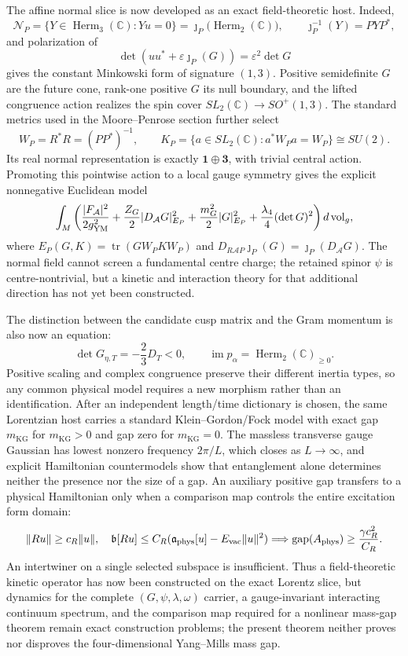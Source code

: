 \documentclass[10pt,letterpaper]{article}
\begin{document}
The affine normal slice is now developed as an exact field-theoretic host.
Indeed,
\[
 \mathcal N_P=\{Y\in\operatorname{Herm}_3(\mathbb C):Yu=0\}
 =\jmath_P\bigl(\operatorname{Herm}_2(\mathbb C)\bigr),
 \qquad \jmath_P^{-1}(Y)=PYP^*,
\]
and polarization of
\[
 \det(uu^*+\varepsilon\jmath_P(G))=\varepsilon^2\det G
\]
gives the constant Minkowski form of signature \((1,3)\).  Positive
semidefinite \(G\) are the future cone, rank-one positive \(G\) its null
boundary, and the lifted congruence action realizes the spin cover
\(SL_2(\mathbb C)\to SO^+(1,3)\).  The standard metrics used in the
Moore--Penrose section further select
\[
 W_P=R^*R=(PP^*)^{-1},\qquad
 K_P=\{a\in SL_2(\mathbb C):a^*W_Pa=W_P\}\cong SU(2).
\]
Its real normal representation is exactly
\(\boldsymbol1\oplus\boldsymbol3\), with trivial central action.  Promoting
this pointwise action to a local gauge symmetry gives the explicit
nonnegative Euclidean model
\[
 \int_M\left(
 \frac{|F_{\mathcal A}|^2}{2g_{\rm YM}^2}
 +\frac{Z_G}{2}|D_{\mathcal A}G|_{E_P}^2
 +\frac{m_G^2}{2}|G|_{E_P}^2
 +\frac{\lambda_4}{4}(\det G)^2\right)d\operatorname{vol}_g,
\]
where
\(E_P(G,K)=\operatorname{tr}(GW_PKW_P)\) and
\(D_{R\mathcal A P}\jmath_P(G)=\jmath_P(D_{\mathcal A}G)\).
The normal field cannot screen a fundamental centre charge; the retained
spinor \(\psi\) is centre-nontrivial, but a kinetic and interaction theory for
that additional direction has not yet been constructed.

The distinction between the candidate cusp matrix and the Gram momentum is
also now an equation:
\[
 \det G_{\eta,T}=-\frac23D_T<0,\qquad
 \operatorname{im}p_\alpha=
 \operatorname{Herm}_2(\mathbb C)_{\geq0}.
\]
Positive scaling and complex congruence preserve their different inertia
types, so any common physical model requires a new morphism rather than an
identification.  After an independent length/time dictionary is chosen, the
same Lorentzian host carries a standard Klein--Gordon/Fock model with exact
gap \(m_{\mathrm{KG}}\) for \(m_{\mathrm{KG}}>0\) and gap zero for
\(m_{\mathrm{KG}}=0\).  The massless transverse gauge Gaussian has lowest
nonzero frequency \(2\pi/L\), which closes as \(L\to\infty\), and explicit
Hamiltonian countermodels show that entanglement alone determines neither
the presence nor the size of a gap.  An auxiliary positive gap transfers to
a physical Hamiltonian only when a comparison map controls the entire
excitation form domain:
\[
 \|Ru\|\geq c_R\|u\|,\quad
 \mathfrak b[Ru]\leq C_R
 (\mathfrak a_{\rm phys}[u]-E_{\rm vac}\|u\|^2)
 \Longrightarrow
 \operatorname{gap}(A_{\rm phys})\geq\frac{\gamma c_R^2}{C_R}.
\]
An intertwiner on a single selected subspace is insufficient.  Thus a
field-theoretic kinetic operator has now been constructed on the exact
Lorentz slice, but dynamics for the complete
\((G,\psi,\lambda,\omega)\) carrier, a gauge-invariant interacting continuum
spectrum, and the comparison map required for a nonlinear mass-gap theorem
remain exact construction problems; the present theorem neither proves nor
disproves the four-dimensional Yang--Mills mass gap.
\end{document}

